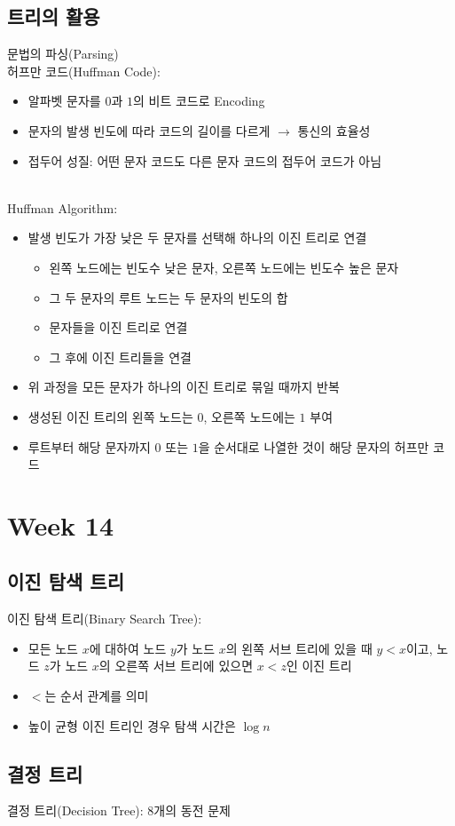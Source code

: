 \subsection{트리의 활용}
문법의 파싱(Parsing)\\
허프만 코드(Huffman Code):
\begin{itemize}
    \item 알파벳 문자를 $0$과 $1$의 비트 코드로 Encoding
    \item 문자의 발생 빈도에 따라 코드의 길이를 다르게 $\to$ 통신의 효율성
    \item 접두어 성질: 어떤 문자 코드도 다른 문자 코드의 접두어 코드가 아님
\end{itemize}\phantom{}\\
Huffman Algorithm:
\begin{itemize}
    \item 발생 빈도가 가장 낮은 두 문자를 선택해 하나의 이진 트리로 연결
    \begin{itemize}
        \item 왼쪽 노드에는 빈도수 낮은 문자, 오른쪽 노드에는 빈도수 높은 문자
        \item 그 두 문자의 루트 노드는 두 문자의 빈도의 합
        \item 문자들을 이진 트리로 연결
        \item 그 후에 이진 트리들을 연결
    \end{itemize}
    \item 위 과정을 모든 문자가 하나의 이진 트리로 묶일 때까지 반복
    \item 생성된 이진 트리의 왼쪽 노드는 $0$, 오른쪽 노드에는 $1$ 부여
    \item 루트부터 해당 문자까지 $0$ 또는 $1$을 순서대로 나열한 것이 해당 문자의 허프만 코드 
\end{itemize}

\newpage 
\section{Week 14}
\subsection{이진 탐색 트리}
이진 탐색 트리(Binary Search Tree):
\begin{itemize}
    \item 모든 노드 $x$에 대하여 노드 $y$가 노드 $x$의 왼쪽 서브 트리에 있을 때 $y < x$이고,
    노드 $z$가 노드 $x$의 오른쪽 서브 트리에 있으면 $x < z$인 이진 트리
    \item $<$는 순서 관계를 의미
    \item 높이 균형 이진 트리인 경우 탐색 시간은 $\log n$
\end{itemize}

\subsection{결정 트리}
결정 트리(Decision Tree): 8개의 동전 문제


